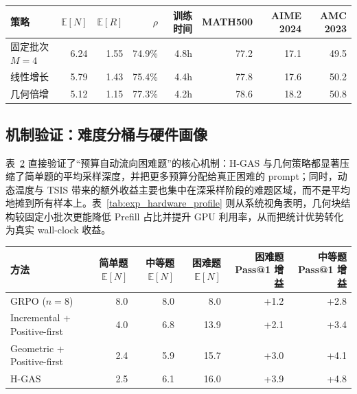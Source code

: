 \begin{table}[!htbp]
    \label{tab:exp_ablation_batch_growth}
    \centering
    \small
    \setlength{\tabcolsep}{3pt}
    \begin{tabular}{lrrrrrrr}
        \hline
        策略 & $\mathbb{E}[N]$ & $\mathbb{E}[R]$ & $\rho$ & 训练时间 & MATH500 & AIME 2024 & AMC 2023 \\
        \hline
        固定批次 $M=4$ & 6.24 & 1.55 & 74.9\% & 4.8h & 77.2 & 17.1 & 49.5 \\
        线性增长 & 5.79 & 1.43 & 75.4\% & 4.4h & 77.8 & 17.6 & 50.2 \\
        几何倍增 & 5.12 & 1.15 & 77.3\% & 4.2h & 78.6 & 18.2 & 50.8 \\
        \hline
    \end{tabular}
\end{table}

\subsection{机制验证：难度分桶与硬件画像}

表~\ref{tab:exp_bucket} 直接验证了“预算自动流向困难题”的核心机制：H-GAS 与几何策略都显著压缩了简单题的平均采样深度，并把更多预算分配给真正困难的 prompt；同时，动态温度与 TSIS 带来的额外收益主要也集中在深采样阶段的难题区域，而不是平均地摊到所有样本上。表~\ref{tab:exp_hardware_profile} 则从系统视角表明，几何块结构较固定小批次更能降低 Prefill 占比并提升 GPU 利用率，从而把统计优势转化为真实 wall-clock 收益。

\begin{table}[!htbp]
    \label{tab:exp_bucket}
    \centering
    \small
    \setlength{\tabcolsep}{3pt}
    \begin{tabular}{lrrrrr}
        \hline
        方法 & 简单题 $\mathbb{E}[N]$ & 中等题 $\mathbb{E}[N]$ & 困难题 $\mathbb{E}[N]$ & 困难题 Pass@1 增益 & 中等题 Pass@1 增益 \\
        \hline
        GRPO ($n=8$) & 8.0 & 8.0 & 8.0 & +1.2 & +2.8 \\
        Incremental + Positive-first & 4.0 & 6.8 & 13.9 & +2.1 & +3.4 \\
        Geometric + Positive-first & 2.4 & 5.9 & 15.7 & +3.0 & +4.1 \\
        H-GAS & 2.5 & 6.1 & 16.0 & +3.9 & +4.8 \\
        \hline
    \end{tabular}
\end{table}

